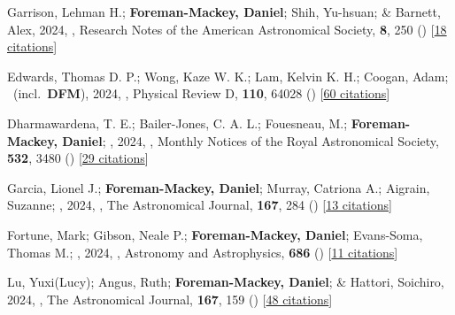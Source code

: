 \item[{\color{numcolor}\scriptsize106}] Garrison, Lehman H.; \textbf{Foreman-Mackey, Daniel}; Shih, Yu-hsuan; \& Barnett, Alex, 2024, , Research Notes of the American Astronomical Society, \textbf{8}, 250 () [\href{https://ui.adsabs.harvard.edu/abs/2024RNAAS...8..250G}{18 citations}]

\item[{\color{numcolor}\scriptsize105}] Edwards, Thomas D. P.; Wong, Kaze W. K.; Lam, Kelvin K. H.; Coogan, Adam; \etal\ (incl.\ \textbf{DFM}), 2024, , Physical Review D, \textbf{110}, 64028 () [\href{https://ui.adsabs.harvard.edu/abs/2024PhRvD.110f4028E}{60 citations}]

\item[{\color{numcolor}\scriptsize104}] Dharmawardena, T. E.; Bailer-Jones, C. A. L.; Fouesneau, M.; \textbf{Foreman-Mackey, Daniel}; \etal, 2024, , Monthly Notices of the Royal Astronomical Society, \textbf{532}, 3480 () [\href{https://ui.adsabs.harvard.edu/abs/2024MNRAS.532.3480D}{29 citations}]

\item[{\color{numcolor}\scriptsize103}] Garcia, Lionel J.; \textbf{Foreman-Mackey, Daniel}; Murray, Catriona A.; Aigrain, Suzanne; \etal, 2024, , The Astronomical Journal, \textbf{167}, 284 () [\href{https://ui.adsabs.harvard.edu/abs/2024AJ....167..284G}{13 citations}]

\item[{\color{numcolor}\scriptsize102}] Fortune, Mark; Gibson, Neale P.; \textbf{Foreman-Mackey, Daniel}; Evans-Soma, Thomas M.; \etal, 2024, , Astronomy and Astrophysics, \textbf{686} () [\href{https://ui.adsabs.harvard.edu/abs/2024A&A...686A..89F}{11 citations}]

\item[{\color{numcolor}\scriptsize101}] Lu, Yuxi(Lucy); Angus, Ruth; \textbf{Foreman-Mackey, Daniel}; \& Hattori, Soichiro, 2024, , The Astronomical Journal, \textbf{167}, 159 () [\href{https://ui.adsabs.harvard.edu/abs/2024AJ....167..159L}{48 citations}]

